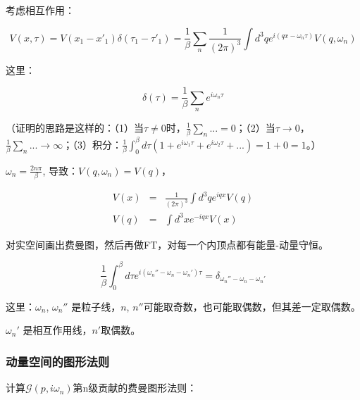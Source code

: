考虑相互作用：

\begin{equation}
V(x, \tau) = V(x_1 - x'_1)\delta(\tau_1 - \tau'_1) = \frac{1}{\beta} \sum\limits_n \frac{1}{(2\pi)^3}\int d^3 q e^{i (q x - \omega_n \tau)} V(q, \omega_n)
\end{equation}

这里：

\begin{equation}
\delta (\tau) = \frac{1}{\beta} \sum\limits_n e^{i \omega_n \tau} 
\end{equation}

（证明的思路是这样的：（1）当$\tau \neq 0$时，$\frac{1}{\beta} \sum\limits_n ... = 0 $；（2）当$\tau \to 0 $，$\frac{1}{\beta} \sum\limits_n ... \to \infty $；（3）积分：$ \frac{1}{\beta}  \int_0^{\beta}  d \tau (1 + e^{i \omega_1 \tau} +  e^{i \omega_2 \tau} + ... ) = 1 + 0 = 1 $。）

$\omega_n = \frac{2n \pi}{\beta}$, 导致：$V(q, \omega_n) = V(q)$，

\begin{eqnarray}
V(x)  &=&  \frac{1}{(2\pi)^3} \int d^3 q e^{i q x} V(q) \\
V(q) &=& \int d^3 x e^{-i q x} V(x)
\end{eqnarray}

对实空间画出费曼图，然后再做FT，对每一个内顶点都有能量-动量守恒。

\begin{equation}
\frac{1}{\beta} \int_0^{\beta} d \tau e^{i (\omega_n'' - \omega_n - \omega_n') \tau } = \delta_{\omega_n'' - \omega_n - \omega_n'}
\end{equation}

这里：$\omega_n$, $\omega_n''$ 是粒子线，$n$, $n''$可能取奇数，也可能取偶数，但其差一定取偶数。

$\omega_n'$ 是相互作用线，$n'$取偶数。

\subsubsection{动量空间的图形法则}

计算$\mathcal{G} (p, i \omega_n)$第n级贡献的费曼图形法则：

